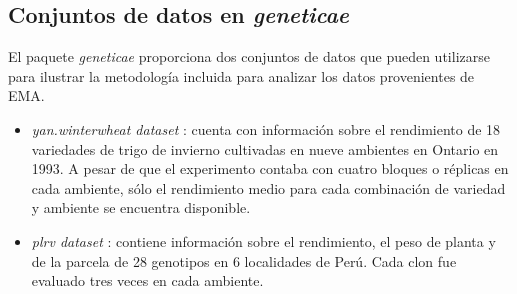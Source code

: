 \subsection{Conjuntos de datos en \emph{geneticae}}
\label{subsec:datosejemplos}
El paquete \emph{geneticae} proporciona dos conjuntos de datos que pueden utilizarse para ilustrar la metodología incluida para analizar los datos provenientes de EMA. 

\begin{itemize}[wide, nosep, labelindent = 0pt, topsep = 1ex, noitemsep,topsep=0pt]
\item \emph{yan.winterwheat dataset} \citep{Wright2020}: cuenta con información sobre el rendimiento de 18 variedades de trigo de invierno cultivadas en nueve ambientes en Ontario en 1993. A pesar de que el experimento contaba con cuatro bloques o réplicas en cada ambiente, sólo el rendimiento medio para cada combinación de variedad y ambiente se encuentra disponible.\\


\item \emph{plrv dataset} \citep{deMendiburu2020}: contiene información sobre el rendimiento, el peso de planta y de la parcela de 28 genotipos en 6 localidades de Perú. Cada clon fue evaluado tres veces en cada ambiente. \\

\end{itemize}
   
